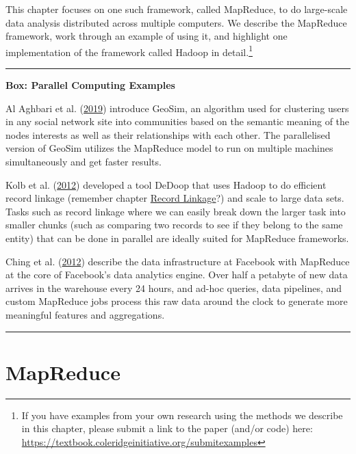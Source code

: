 \documentclass[]{krantz}
\begin{document}
This chapter focuses on one such framework, called MapReduce, to do
large-scale data analysis distributed across multiple computers. We
describe the MapReduce framework, work through an example of using it,
and highlight one implementation of the framework called Hadoop in
detail.\footnote{If you have examples from your own research using the
  methods we describe in this chapter, please submit a link to the paper
  (and/or code) here:
  \url{https://textbook.coleridgeinitiative.org/submitexamples}}

\begin{center}\rule{0.5\linewidth}{\linethickness}\end{center}

\textbf{Box: Parallel Computing Examples}

Al Aghbari et al. (\protect\hyperlink{ref-aghbari2019}{2019}) introduce
GeoSim, an algorithm used for clustering users in any social network
site into communities based on the semantic meaning of the nodes
interests as well as their relationships with each other. The
parallelised version of GeoSim utilizes the MapReduce model to run on
multiple machines simultaneously and get faster results.

Kolb et al. (\protect\hyperlink{ref-kolb2012}{2012}) developed a tool
DeDoop that uses Hadoop to do efficient record linkage (remember chapter
\protect\hyperlink{chap:link}{Record Linkage}?) and scale to large data
sets. Tasks such as record linkage where we can easily break down the
larger task into smaller chunks (such as comparing two records to see if
they belong to the same entity) that can be done in parallel are ideally
suited for MapReduce frameworks.

Ching et al. (\protect\hyperlink{ref-ching2012}{2012}) describe the data
infrastructure at Facebook with MapReduce at the core of Facebook's data
analytics engine. Over half a petabyte of new data arrives in the
warehouse every 24 hours, and ad-hoc queries, data pipelines, and custom
MapReduce jobs process this raw data around the clock to generate more
meaningful features and aggregations.

\begin{center}\rule{0.5\linewidth}{\linethickness}\end{center}

\section{MapReduce}\label{mapreduce}
\end{document}
